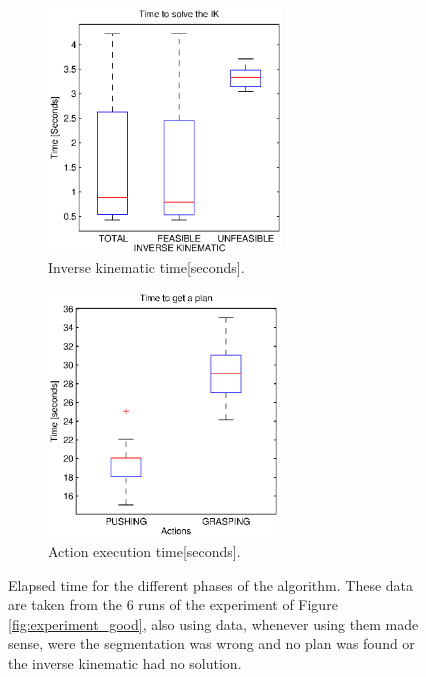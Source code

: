 \begin{figure}[tb]
\begin{subfigure}[t]{0.4\textwidth}
\centering
\includegraphics[height=6.5cm]{Img/experiments/exp_good/data/ik.eps}
\caption{Inverse kinematic time[seconds].}
\end{subfigure}
\begin{subfigure}[t]{0.4\textwidth}
\centering
\includegraphics[height=6.5cm]{Img/experiments/exp_good/data/actions.eps}
\caption{Action execution time[seconds].}
\end{subfigure}
\caption{Elapsed time for the different phases of the algorithm. These data are taken from the 6 runs of the experiment of Figure \ref{fig:experiment_good}, also using data, whenever using them made sense, were the segmentation was wrong and no plan was found or the inverse kinematic had no solution.}\label{fig:time_results}
\end{figure}



